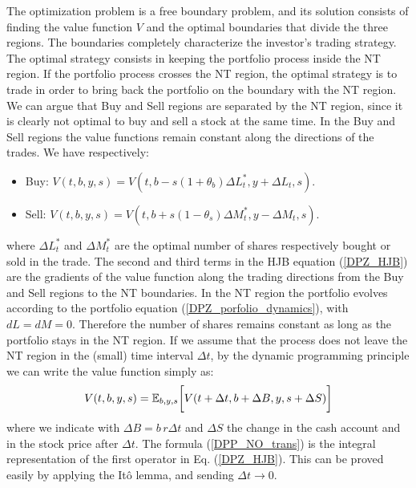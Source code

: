 The optimization problem is a free boundary problem, and its solution consists of finding the value function $V$ and the 
optimal boundaries that divide the three regions.
The boundaries completely characterize the investor's trading strategy.
The optimal strategy consists in keeping the portfolio process inside the NT region. 
If the portfolio process crosses the NT region, the optimal strategy is to trade in order to bring back the portfolio
on the boundary with the NT region.
We can argue that Buy and Sell regions are separated by the NT region, 
since it is clearly not optimal to buy and sell a stock at the same time.
In the Buy and Sell regions the value functions remain constant along the directions of the trades.
We have respectively:
\begin{itemize}
 \item Buy: \hspace{2em} $V(t,b,y,s) = V(t,b-s(1+\theta_b)\Delta L^*_t,y+\Delta L_t,s).$
 \item Sell: \hspace{2em} $ V(t,b,y,s) = V(t,b+s(1-\theta_s)\Delta M^*_t,y-\Delta M_t,s).$
\end{itemize}
where $\Delta L^*_t$ and $\Delta M^*_t$ are the optimal number of shares respectively bought or sold in the trade.
The second and third terms in the HJB equation (\ref{DPZ_HJB}) are the gradients of the value function along the 
trading directions from the Buy and Sell regions to the NT boundaries.
In the NT region the portfolio evolves according to the portfolio equation (\ref{DPZ_porfolio_dynamics}), with $dL=dM=0$.
Therefore the number of shares remains constant as long as the portfolio stays in the NT region.
If we assume that the process does not leave the NT region in the (small) time interval $\Delta t$, 
by the dynamic programming principle we can write the value function simply as:
\begin{equation}\label{DPP_NO_trans}
 V(t,b,y,s) = \mathbb{E}_{b,y,s} \biggl[ V(t+\Delta t, b+\Delta B, y, s+\Delta S ) \biggr] 
\end{equation}
where we indicate with $\Delta B=b\,r\Delta t$ and $\Delta S$ the change in the cash account 
and in the stock price after $\Delta t$. The formula (\ref{DPP_NO_trans}) is the integral representation of the first operator in Eq. (\ref{DPZ_HJB}).
This can be proved easily by applying the Itô lemma, and sending $\Delta t \to 0$.


